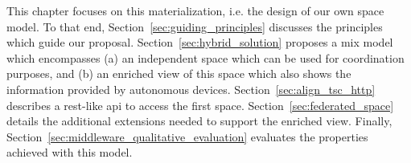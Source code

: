 This chapter focuses on this materialization, i.e. the design of our own space model.
To that end, Section~\ref{sec:guiding_principles} discusses the principles which guide our proposal.
Section~\ref{sec:hybrid_solution} proposes a mix model which encompasses
(a) an independent space which can be used for coordination purposes, and
(b) an enriched view of this space which also shows the information provided by autonomous devices.
Section~\ref{sec:align_tsc_http} describes a \ac{rest}-like \ac{api} to access the first space.
Section~\ref{sec:federated_space} details the additional extensions needed to support the enriched view.
Finally, Section~\ref{sec:middleware_qualitative_evaluation} evaluates the properties achieved with this model.





